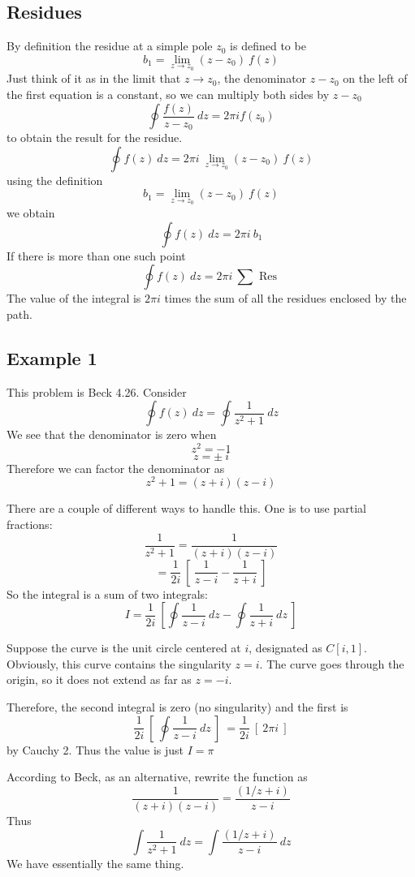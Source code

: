 \documentclass[11pt, oneside]{article}   	%
\begin{document}
\subsection*{Residues}
By definition the residue at a simple pole $z_0$ is defined to be
\[ b_1 = \lim_{z \rightarrow z_0} (z-z_0) \ f(z)  \]
Just think of it as in the limit that $z \rightarrow z_0$, the denominator $z-z_0$ on the left of the first equation is a constant, so we can multiply both sides by $z - z_0$
\[  \oint \frac{f(z)}{z - z_0} \ dz = 2 \pi i f(z_0) \]
to obtain the result for the residue.
\[ \oint f(z) \ dz = 2 \pi i \ \lim_{z \rightarrow z_0} (z-z_0) \ f(z)  \]
using the definition
\[ b_1 = \lim_{z \rightarrow z_0} (z-z_0) \ f(z)  \]
we obtain
\[ \oint f(z) \ dz = 2 \pi i \ b_1  \]
If there is more than one such point
\[ \oint f(z) \ dz = 2 \pi i \ \sum \text{ Res } \]
The value of the integral is $2 \pi i$ times the sum of all the residues enclosed by the path.

\subsection*{Example 1}
This problem is Beck 4.26.  Consider 
\[ \oint f(z) \ dz = \oint \frac{1}{z^2 + 1} \ dz \]
We see that the denominator is zero when
\[ z^2 = -1 \]
\[ z = \pm \ i \]
Therefore we can factor the denominator as
\[ z^2 + 1 = (z + i) (z-i) \]

There are a couple of different ways to handle this.  One is to use partial fractions:
\[ \frac{1}{z^2 + 1} = \frac{1}{(z + i) (z-i)} \]
\[ = \frac{1}{2i} \ [ \ \frac{1}{z - i} - \frac{1}{z+i} \ ] \]
So the integral is a sum of two integrals:
\[ I = \frac{1}{2i} \ [ \oint \frac{1}{z - i}  \ dz -  \oint \frac{1}{z + i} \ dz \ ] \] 

Suppose the curve is the unit circle centered at $i$, designated as $C[i,1]$.  Obviously, this curve contains the singularity $z = i$.  The curve goes through the origin, so it does not extend as far as $z = -i$.

Therefore, the second integral is zero (no singularity) and the first is
\[ \frac{1}{2i} \ [ \ \oint \frac{1}{z - i}  \ dz \ ] \ = \frac{1}{2i} \ [ \  2 \pi i \ ] \]
by Cauchy 2.  Thus the value is just $I = \pi$

According to Beck, as an alternative, rewrite the function as
\[ \frac{1}{(z + i) (z-i)} = \frac{(1/z+i)}{z-i} \]
Thus
\[ \int \frac{1}{z^2 + 1} \ dz = \int \frac{(1/z+i)}{z-i} \ dz \]
We have essentially the same thing.
\end{document}
